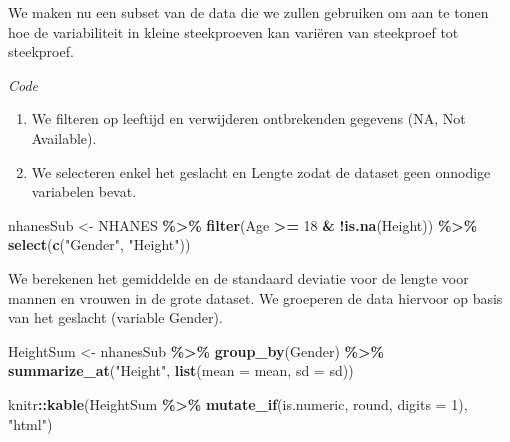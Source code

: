 \documentclass[
  12pt,dutch,coursenotes]{book}
\newenvironment{Shaded}{\begin{snugshade}}{\end{snugshade}}
\newcommand{\DataTypeTok}[1]{\textcolor[rgb]{0.13,0.29,0.53}{#1}}
\newcommand{\DecValTok}[1]{\textcolor[rgb]{0.00,0.00,0.81}{#1}}
\newcommand{\KeywordTok}[1]{\textcolor[rgb]{0.13,0.29,0.53}{\textbf{#1}}}
\newcommand{\NormalTok}[1]{#1}
\newcommand{\OperatorTok}[1]{\textcolor[rgb]{0.81,0.36,0.00}{\textbf{#1}}}
\newcommand{\StringTok}[1]{\textcolor[rgb]{0.31,0.60,0.02}{#1}}
\providecommand{\tightlist}{%
  \setlength{\itemsep}{0pt}\setlength{\parskip}{0pt}}
\theoremstyle{definition}
\theoremstyle{definition}
\theoremstyle{definition}
\theoremstyle{remark}
\begin{document}
We maken nu een subset van de data die we zullen gebruiken om aan te tonen hoe de variabiliteit in kleine steekproeven kan variëren van steekproef tot steekproef.

\emph{Code}

\begin{enumerate}
\def\labelenumi{\arabic{enumi}.}
\tightlist
\item
  We filteren op leeftijd en verwijderen ontbrekenden gegevens (NA, Not Available).
\item
  We selecteren enkel het geslacht en Lengte zodat de dataset geen onnodige variabelen bevat.
\end{enumerate}

\begin{Shaded}
\begin{Highlighting}[]
\NormalTok{nhanesSub \textless{}{-}}\StringTok{ }\NormalTok{NHANES }\OperatorTok{\%\textgreater{}\%}\StringTok{ }\KeywordTok{filter}\NormalTok{(Age }\OperatorTok{\textgreater{}=}\StringTok{ }\DecValTok{18} \OperatorTok{\&}\StringTok{ }\OperatorTok{!}\KeywordTok{is.na}\NormalTok{(Height)) }\OperatorTok{\%\textgreater{}\%}\StringTok{ }
\StringTok{    }\KeywordTok{select}\NormalTok{(}\KeywordTok{c}\NormalTok{(}\StringTok{"Gender"}\NormalTok{, }\StringTok{"Height"}\NormalTok{))}
\end{Highlighting}
\end{Shaded}

We berekenen het gemiddelde en de standaard deviatie voor de lengte voor mannen en vrouwen in de grote dataset.
We groeperen de data hiervoor op basis van het geslacht (variable Gender).

\begin{Shaded}
\begin{Highlighting}[]
\NormalTok{HeightSum \textless{}{-}}\StringTok{ }\NormalTok{nhanesSub }\OperatorTok{\%\textgreater{}\%}\StringTok{ }\KeywordTok{group\_by}\NormalTok{(Gender) }\OperatorTok{\%\textgreater{}\%}\StringTok{ }\KeywordTok{summarize\_at}\NormalTok{(}\StringTok{"Height"}\NormalTok{, }
    \KeywordTok{list}\NormalTok{(}\DataTypeTok{mean =}\NormalTok{ mean, }\DataTypeTok{sd =}\NormalTok{ sd))}

\NormalTok{knitr}\OperatorTok{::}\KeywordTok{kable}\NormalTok{(HeightSum }\OperatorTok{\%\textgreater{}\%}\StringTok{ }\KeywordTok{mutate\_if}\NormalTok{(is.numeric, round, }
    \DataTypeTok{digits =} \DecValTok{1}\NormalTok{), }\StringTok{"html"}\NormalTok{)}
\end{Highlighting}
\end{Shaded}
\end{document}
